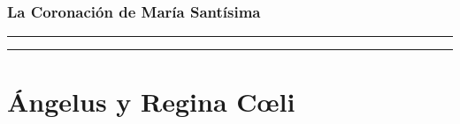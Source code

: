 \documentclass[11pt,a4paper]{report}
\begin{document}
    \subsubsection*{La Coronación de María Santísima}
    
    
    \rule{\textwidth}{0.5pt}
    
    \rule{\textwidth}{0.5pt}
    

    \section*{Ángelus y Regina Cœli}
    
\end{document}
